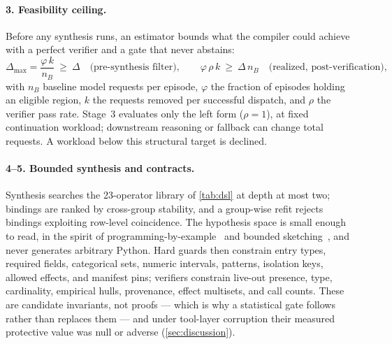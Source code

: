 \paragraph{3. Feasibility ceiling.}
Before any synthesis runs, an estimator bounds what the compiler could achieve
with a perfect verifier and a gate that never abstains:
\begin{equation}
  \Delta_{\max}=\frac{\varphi\,k}{n_B}\ \ge\ \Delta
  \quad\text{(pre-synthesis filter)},
  \qquad
  \varphi\,\rho\,k \ \ge\ \Delta\,n_B
  \quad\text{(realized, post-verification)},
  \label{eq:ceiling}
\end{equation}
with $n_B$ baseline model requests per episode, $\varphi$ the fraction of
episodes holding an eligible region, $k$ the requests removed per successful
dispatch, and $\rho$ the verifier pass rate. Stage~3 evaluates only the left
form ($\rho=1$), at fixed continuation workload; downstream reasoning or
fallback can change total requests. A workload below this structural target is
declined.

\paragraph{4--5. Bounded synthesis and contracts.}
Synthesis searches the 23-operator library of \cref{tab:dsl} at depth at most
two; bindings are ranked by cross-group stability, and a group-wise refit
rejects bindings exploiting row-level coincidence. The hypothesis space is
small enough to read, in the spirit of
programming-by-example~\citep{gulwani2011flashfill} and bounded
sketching~\citep{solarlezama2006sketching}, and never generates arbitrary
Python. Hard guards then constrain entry types, required fields,
categorical sets, numeric intervals, patterns, isolation keys, allowed effects,
and manifest pins; verifiers constrain live-out presence, type, cardinality,
empirical hulls, provenance, effect multisets, and call counts. These are
candidate invariants, not proofs --- which is why a statistical gate follows
rather than replaces them --- and under tool-layer corruption their measured
protective value was null or adverse (\cref{sec:discussion}).

